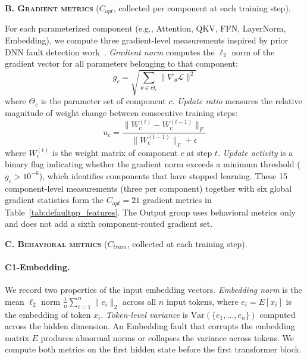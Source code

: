 \vspace{0.5em}
\noindent\textbf{\textsc{B. Gradient metrics}} ($C_{opt}$, collected per component at each training step).

For each parameterized component (e.g., Attention, QKV, FFN, LayerNorm, Embedding), we compute three gradient-level measurements inspired by prior DNN fault detection work~\cite{default,deepfd}. \emph{Gradient norm} computes the $\ell_2$ norm of the gradient vector for all parameters belonging to that component:
\begin{equation}
g_c = \sqrt{\sum_{\theta \in \Theta_c} \|\nabla_\theta \mathcal{L}\|^2}
\label{eq:component_grad_norm}
\end{equation}
where $\Theta_c$ is the parameter set of component $c$. \emph{Update ratio} measures the relative magnitude of weight change between consecutive training steps:
\begin{equation}
u_c = \frac{\|W_c^{(t)} - W_c^{(t-1)}\|_F}{\|W_c^{(t-1)}\|_F + \epsilon}
\label{eq:component_update_ratio}
\end{equation}
where $W_c^{(t)}$ is the weight matrix of component $c$ at step $t$. \emph{Update activity} is a binary flag indicating whether the gradient norm exceeds a minimum threshold ($g_c > 10^{-6}$), which identifies components that have stopped learning. These 15 component-level measurements (three per component) together with six global gradient statistics form the $C_{opt}=21$ gradient metrics in Table~\ref{tab:defaultpp_features}. The Output group uses behavioral metrics only and does not add a sixth component-routed gradient set.

\vspace{0.5em}
\noindent\textbf{\textsc{C. Behavioral metrics}} ($C_{train}$, collected at each training step).

\paragraph{C1-Embedding.} We record two properties of the input embedding vectors. \emph{Embedding norm} is the mean $\ell_2$ norm $\frac{1}{n}\sum_{i=1}^{n}\|e_i\|_2$ across all $n$ input tokens, where $e_i = E[x_i]$ is the embedding of token $x_i$. \emph{Token-level variance} is $\text{Var}(\{e_1, \ldots, e_n\})$ computed across the hidden dimension. An Embedding fault that corrupts the embedding matrix $E$ produces abnormal norms or collapses the variance across tokens. We compute both metrics on the first hidden state before the first transformer block.

